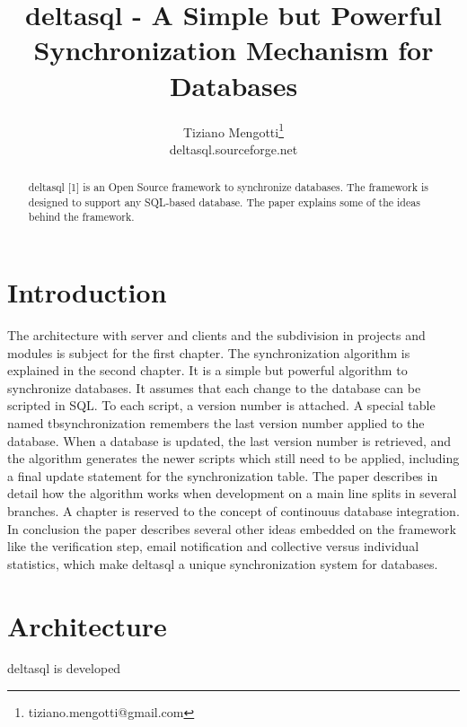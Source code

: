 \documentclass[10pt,a4paper]{article}
\begin{document}
\pagestyle{headings}

\title{deltasql - A Simple but Powerful Synchronization Mechanism for Databases}

\author{Tiziano Mengotti\thanks{tiziano.mengotti@gmail.com}\\
deltasql.sourceforge.net\\}

\maketitle
\thispagestyle{empty}

\begin{abstract}
deltasql [1] is an Open Source framework to synchronize databases. The framework is designed to support any SQL-based database. The paper explains some of the ideas behind the framework.
\end{abstract}

\section{Introduction}
\label{sec:intro}

The architecture with server and clients and the subdivision in projects and modules is subject for the first chapter. 
The synchronization algorithm is explained in the second chapter. It is a simple but powerful algorithm to synchronize databases. It assumes that each change to the database can be scripted in SQL. To each script, a version number is attached. A special table named tbsynchronization remembers the last version number applied to the database. When a database is updated, the last version number is retrieved, and the algorithm generates the newer scripts which still need to be applied, including a final update statement for the synchronization table. The paper describes in detail how the algorithm works when development on a main line splits in several branches. 
A chapter is reserved to the concept of continouus database integration. In conclusion the paper describes several other ideas embedded on the framework like the verification step, email notification and collective versus individual statistics, which make deltasql a unique synchronization system for databases. 

\section{Architecture}

deltasql is developed 
\end{document}
